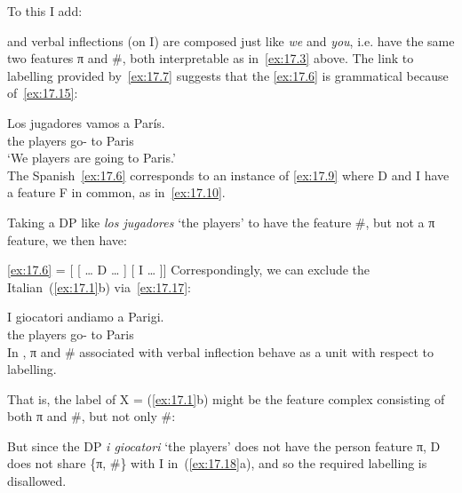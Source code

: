 \documentclass[output=paper]{langsci/langscibook}
\begin{document}
To this I add:

\ea\label{ex:17.14}
    \Fpl{} and \Spl{} verbal inflections (on I) are composed just like \emph{we}
    and \emph{you}, i.e. have the same two features π and \#, both interpretable
    as in~\eqref{ex:17.3} above.
\z
The link to labelling provided by~\eqref{ex:17.7} suggests that the 
\eqref{ex:17.6} is grammatical because of~\eqref{ex:17.15}:

\begin{exe}
\exi{\eqref{ex:17.6}}
    \gll    Los jugadores vamos a París.\\
            the players      go-\Fpl{} to Paris\\
    \glt    ‘We players are going to Paris.’\\
\ex\label{ex:17.15}
    The Spanish~\eqref{ex:17.6} corresponds to an instance of \eqref{ex:17.9}
    where D and I have a feature F in common, as in~\eqref{ex:17.10}.
\end{exe}
Taking a DP like \emph{los jugadores} ‘the players’ to have the feature \#, but
not a π feature, we then have:

\ea\label{ex:17.16}
    \eqref{ex:17.6} = [ [ \dots{} D\tss{\#} \dots{} ] [ I\tss{\#} \dots{} ]]
\z
Correspondingly, we can exclude the Italian~(\ref{ex:17.1}b)
via~\eqref{ex:17.17}:

\begin{exe}
    \gll I giocatori andiamo a Parigi.\\
    the players go-\Fpl{} to Paris\\
    \glt
\ex\label{ex:17.17}
    In , π and \# associated with verbal inflection behave as a unit
    with respect to labelling.
\end{exe}
That is, the label of X = (\ref{ex:17.1}b) might be the feature complex
consisting of both π and \#, but not only \#:

\ea\label{ex:17.18}
    \z
\z
But since the DP \emph{i giocatori} ‘the players’ does not have the person
feature π, D does not share \{π, \#\} with I in~(\ref{ex:17.18}a), and so the
required labelling is disallowed.
\end{document}
